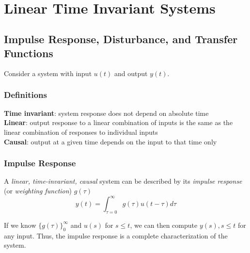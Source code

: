 \documentclass{article}
\begin{document}
\section{Linear Time Invariant Systems}

\subsection{Impulse Response, Disturbance, and Transfer Functions}
Consider a system with input $u(t)$ and output $y(t)$. 

\subsubsection{Definitions}
{\bf Time invariant}: system response does not depend on absolute time\\
{\bf Linear}: output response to a linear combination of inputs is the
    same as the linear combination of responses to individual inputs\\
{\bf Causal}: output at a given time depends on the input to that time only\\
\subsubsection{Impulse Response}
A {\it linear, time-invariant, causal} system can be described by its
{\it impulse response} (or {\it weighting function}) $g(\tau)$
\begin{equation*}
    y(t) = \int_{\tau=0}^\infty g(\tau) u(t - \tau) d\tau
\end{equation*}

If we know $\bigl\{g(\tau)\bigr\}_0^\infty$ and $u(s)$ for $s \le t$, we can then
compute $y(s), s \le t$ for any input. Thus, the impulse response is a complete
characterization of the system.
\end{document}
